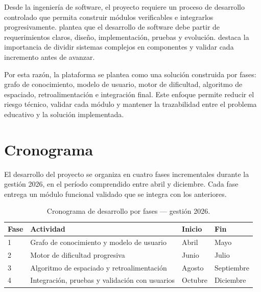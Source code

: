 \documentclass{univalle-perfil}
\begin{document}
Desde la ingeniería de software, el proyecto requiere un proceso de desarrollo controlado que permita construir módulos verificables e integrarlos progresivamente. \textcite{sommerville2016} plantea que el desarrollo de software debe partir de requerimientos claros, diseño, implementación, pruebas y evolución. \textcite{pressman2014} destaca la importancia de dividir sistemas complejos en componentes y validar cada incremento antes de avanzar.

Por esta razón, la plataforma se plantea como una solución construida por fases: grafo de conocimiento, modelo de usuario, motor de dificultad, algoritmo de espaciado, retroalimentación e integración final. Este enfoque permite reducir el riesgo técnico, validar cada módulo y mantener la trazabilidad entre el problema educativo y la solución implementada.

\section{Cronograma}

El desarrollo del proyecto se organiza en cuatro fases incrementales durante la gestión 2026, en el período comprendido entre abril y diciembre. Cada fase entrega un módulo funcional validado que se integra con los anteriores.

\begin{table}[H]
\centering
\caption{Cronograma de desarrollo por fases — gestión 2026.}
\begin{tabular}{llll}
\toprule
\textbf{Fase} & \textbf{Actividad} & \textbf{Inicio} & \textbf{Fin} \\
\midrule
1 & Grafo de conocimiento y modelo de usuario & Abril & Mayo \\
2 & Motor de dificultad progresiva & Junio & Julio \\
3 & Algoritmo de espaciado y retroalimentación & Agosto & Septiembre \\
4 & Integración, pruebas y validación con usuarios & Octubre & Diciembre \\
\bottomrule
\end{tabular}
\end{table}


\end{document}
